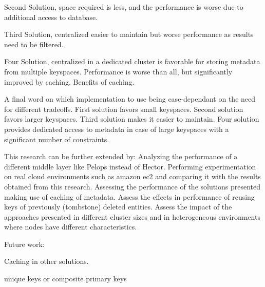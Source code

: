 Second Solution, space required is less, and the performance is worse due to
additional access to database.
	
Third Solution, centralized easier to maintain but worse performance as  results
need to be filtered.
	
Four Solution, centralized in a dedicated cluster is favorable for storing
metadata from multiple keyspaces. Performance is worse than all, but
significantly improved by caching. Benefits of caching.
	
A final word on which implementation to use being case-dependant on the need for
different tradeoffs. First solution favors small keyspaces. Second solution
favors larger keyspaces. Third solution makes it easier to maintain. Four
solution provides dedicated access to metadata in case of large keyspaces with a
significant number of constraints.
	
This research can be further extended by:
Analyzing the performance of a different middle layer like Pelops instead of
Hector.
Performing experimentation on real cloud environments such as amazon ec2 and
comparing it with the results obtained from this research.
Assessing the performance of the solutions presented making use of caching of
metadata.
Assess the effects in performance of reusing keys of previously (tombstone)
deleted entities.
Assess the impact of the approaches presented in different cluster sizes and in
heterogeneous environments where nodes have different characteristics.
	
	
	
	
	
	
	
	
Future work:
	
Caching in other solutions.
		
unique keys or composite primary keys
	
	
